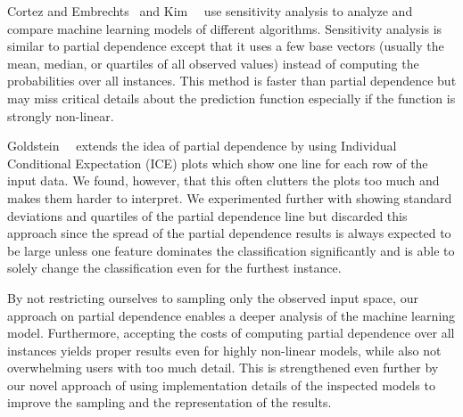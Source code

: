 Cortez and Embrechts~\cite{cortez2011opening,Cortez20131} and Kim~\etal~\cite{kim2014bayesian}
use sensitivity analysis to analyze and compare machine learning models of different algorithms.
Sensitivity analysis is similar to partial dependence except that it uses a few
base vectors (usually the mean, median, or quartiles of all observed values)
instead of computing the probabilities over all instances.
This method is faster than partial dependence but may miss critical details
about the prediction function especially if the function is strongly non-linear.

Goldstein~\etal~\cite{goldstein14} extends the idea of partial dependence by using
Individual Conditional Expectation (ICE) plots which show one line for each row of the input data.
We found, however, that this often clutters the plots too much and makes them harder to interpret.
We experimented further with showing standard deviations and quartiles of the partial dependence line
but discarded this approach since the spread of the partial dependence results is always expected to
be large unless one feature dominates the classification significantly and is able to solely change
the classification even for the furthest instance.

By not restricting ourselves to sampling only the observed input space, our approach on partial dependence
enables a deeper analysis of the machine learning model. Furthermore, accepting the costs of computing
partial dependence over all instances yields proper results even for highly non-linear models,
while also not overwhelming users with too much detail.
This is strengthened even further by our novel approach of using implementation details of the inspected
models to improve the sampling and the representation of the results.
